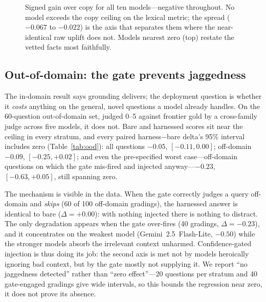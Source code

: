 \documentclass[11pt]{article}
\begin{document}
\begin{figure}[t]\centering
{}
\caption{Signed gain over copy for all ten models---negative throughout. No model exceeds the copy
ceiling on the lexical metric; the spread ($-0.067$ to $-0.022$) is the axis that separates them
where the near-identical raw uplift does not. Models nearest zero (top) restate the vetted facts
most faithfully.}
\label{fig:gain}
\end{figure}

\subsection{Out-of-domain: the gate prevents jaggedness}\label{sec:ood}
The in-domain result says grounding delivers; the deployment question is whether it \emph{costs}
anything on the general, novel questions a model already handles. On the 60-question out-of-domain
set, judged 0--5 against frontier gold by a cross-family judge across five models, it does not.
Bare and harnessed scores sit near the ceiling in every stratum, and every paired harness$-$bare
delta's 95\% interval includes zero (Table~\ref{tab:ood}): all questions $-0.05$, $[-0.11,0.00]$;
off-domain $-0.09$, $[-0.25,+0.02]$; and even the pre-specified worst case---off-domain questions
on which the gate mis-fired and injected anyway---$-0.23$, $[-0.63,+0.05]$, still spanning zero.

The mechanism is visible in the data. When the gate correctly judges a query off-domain and
\emph{skips} (60 of 100 off-domain gradings), the harnessed answer is identical to bare
($\Delta=+0.00$): with nothing injected there is nothing to distract. The only degradation appears
when the gate over-fires (40 gradings, $\Delta=-0.23$), and it concentrates on the weakest model
(Gemini~2.5~Flash-Lite, $-0.50$) while the stronger models absorb the irrelevant context unharmed.
Confidence-gated injection is thus doing its job: the second axis is met not by models heroically
ignoring bad context, but by the gate mostly not supplying it. We report ``no jaggedness detected''
rather than ``zero effect''---20 questions per stratum and 40 gate-engaged gradings give wide
intervals, so this bounds the regression near zero, it does not prove its absence.
\end{document}
